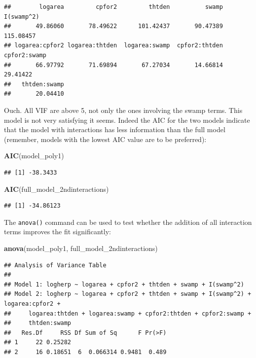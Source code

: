 \documentclass[
  12pt,
]{book}
\newenvironment{Shaded}{\begin{snugshade}}{\end{snugshade}}
\newcommand{\KeywordTok}[1]{\textcolor[rgb]{0.13,0.29,0.53}{\textbf{#1}}}
\newcommand{\NormalTok}[1]{#1}
\begin{document}
\begin{verbatim}
##        logarea         cpfor2         thtden          swamp     I(swamp^2) 
##       49.86060       78.49622      101.42437       90.47389      115.08457 
## logarea:cpfor2 logarea:thtden  logarea:swamp  cpfor2:thtden   cpfor2:swamp 
##       66.97792       71.69894       67.27034       14.66814       29.41422 
##   thtden:swamp 
##       20.04410
\end{verbatim}

Ouch. All VIF are above 5, not only the ones involving the swamp terms. This model is not very satisfying it seems. Indeed the AIC for the two models indicate that the model with interactions has less information than the full model (remember, models with the lowest AIC value are to be preferred):

\begin{Shaded}
\begin{Highlighting}[]
\KeywordTok{AIC}\NormalTok{(model\_poly1)}
\end{Highlighting}
\end{Shaded}

\begin{verbatim}
## [1] -38.3433
\end{verbatim}

\begin{Shaded}
\begin{Highlighting}[]
\KeywordTok{AIC}\NormalTok{(full\_model\_2ndinteractions)}
\end{Highlighting}
\end{Shaded}

\begin{verbatim}
## [1] -34.86123
\end{verbatim}

The \texttt{anova()} command can be used to test whether the addition of all
interaction terms improves the fit significantly:

\begin{Shaded}
\begin{Highlighting}[]
\KeywordTok{anova}\NormalTok{(model\_poly1, full\_model\_2ndinteractions)}
\end{Highlighting}
\end{Shaded}

\begin{verbatim}
## Analysis of Variance Table
## 
## Model 1: logherp ~ logarea + cpfor2 + thtden + swamp + I(swamp^2)
## Model 2: logherp ~ logarea + cpfor2 + thtden + swamp + I(swamp^2) + logarea:cpfor2 + 
##     logarea:thtden + logarea:swamp + cpfor2:thtden + cpfor2:swamp + 
##     thtden:swamp
##   Res.Df     RSS Df Sum of Sq      F Pr(>F)
## 1     22 0.25282                           
## 2     16 0.18651  6  0.066314 0.9481  0.489
\end{verbatim}
\end{document}
